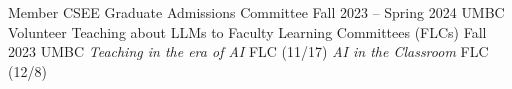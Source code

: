 {\color{black}\fontsize{12pt}{1em}} 

\begin{cventries}
\cventry
    {Member}
    {CSEE Graduate Admissions Committee}
    {Fall 2023 -- Spring 2024}
    {UMBC}
    {}    
\cventry
    {Volunteer}
    {Teaching about LLMs to Faculty Learning Committees (FLCs)}
    {Fall 2023}
    {UMBC}
    {\textit{Teaching in the era of AI} FLC (11/17)\newline
    \textit{AI in the Classroom} FLC (12/8)}   
\end{cventries}


